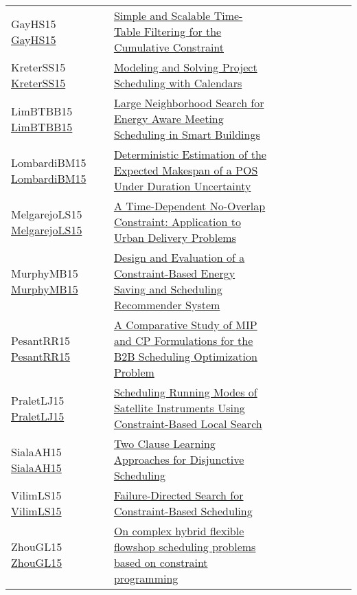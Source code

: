 {\begin{longtable}{p{3cm}p{7cm}lllllll}
GayHS15 \href{https://doi.org/10.1007/978-3-319-23219-5\_11}{GayHS15} &  \href{papers/GayHS15.pdf}{Simple and Scalable Time-Table Filtering for the Cumulative Constraint} &  &  &  &  &  &  & \\
KreterSS15 \href{https://doi.org/10.1007/978-3-319-23219-5\_19}{KreterSS15} &  \href{papers/KreterSS15.pdf}{Modeling and Solving Project Scheduling with Calendars} &  &  &  &  &  &  & \\
LimBTBB15 \href{https://doi.org/10.1007/978-3-319-18008-3\_17}{LimBTBB15} &  \href{papers/LimBTBB15.pdf}{Large Neighborhood Search for Energy Aware Meeting Scheduling in Smart Buildings} &  &  &  &  &  &  & \\
LombardiBM15 \href{https://doi.org/10.1007/978-3-319-23219-5\_20}{LombardiBM15} &  \href{papers/LombardiBM15.pdf}{Deterministic Estimation of the Expected Makespan of a {POS} Under Duration Uncertainty} &  &  &  &  &  &  & \\
MelgarejoLS15 \href{https://doi.org/10.1007/978-3-319-18008-3\_1}{MelgarejoLS15} &  \href{papers/MelgarejoLS15.pdf}{A Time-Dependent No-Overlap Constraint: Application to Urban Delivery Problems} &  &  &  &  &  &  & \\
MurphyMB15 \href{https://doi.org/10.1007/978-3-319-23219-5\_47}{MurphyMB15} &  \href{papers/MurphyMB15.pdf}{Design and Evaluation of a Constraint-Based Energy Saving and Scheduling Recommender System} &  &  &  &  &  &  & \\
PesantRR15 \href{https://doi.org/10.1007/978-3-319-18008-3\_21}{PesantRR15} &  \href{papers/PesantRR15.pdf}{A Comparative Study of {MIP} and {CP} Formulations for the {B2B} Scheduling Optimization Problem} &  &  &  &  &  &  & \\
PraletLJ15 \href{https://doi.org/10.1007/978-3-319-23219-5\_48}{PraletLJ15} &  \href{papers/PraletLJ15.pdf}{Scheduling Running Modes of Satellite Instruments Using Constraint-Based Local Search} &  &  &  &  &  &  & \\
SialaAH15 \href{https://doi.org/10.1007/978-3-319-23219-5\_28}{SialaAH15} &  \href{papers/SialaAH15.pdf}{Two Clause Learning Approaches for Disjunctive Scheduling} &  &  &  &  &  &  & \\
VilimLS15 \href{https://doi.org/10.1007/978-3-319-18008-3\_30}{VilimLS15} &  \href{papers/VilimLS15.pdf}{Failure-Directed Search for Constraint-Based Scheduling} &  &  &  &  &  &  & \\
ZhouGL15 \href{https://doi.org/10.1109/FSKD.2015.7382064}{ZhouGL15} &  \href{papers/ZhouGL15.pdf}{On complex hybrid flexible flowshop scheduling problems based on constraint programming} &  &  &  &  &  &  & \\

\end{longtable}}
